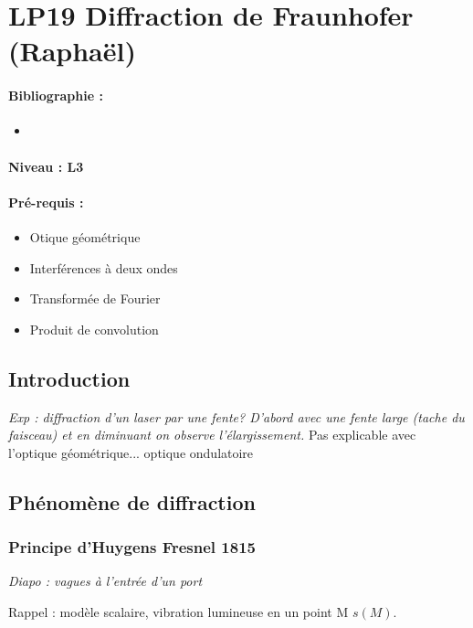 \section{LP19 Diffraction de Fraunhofer (Raphaël) }

\paragraph{Bibliographie :}
\begin{itemize}
\item 
\end{itemize}

\paragraph{Niveau : L3} 

\paragraph{Pré-requis :}
\begin{itemize}
\item Otique géométrique
\item Interférences à deux ondes
\item Transformée de Fourier
\item Produit de convolution
\end{itemize}

\subsection{Introduction}

\emph{Exp : diffraction d'un laser par une fente? D'abord avec une fente large (tache du faisceau) et en diminuant on observe l'élargissement.}
Pas explicable avec l'optique géométrique... optique ondulatoire

\subsection{Phénomène de diffraction}

\subsubsection{Principe d'Huygens Fresnel 1815}

\emph{Diapo : vagues à l'entrée d'un port}

Rappel : modèle scalaire, vibration lumineuse en un point M $s(M)$.

